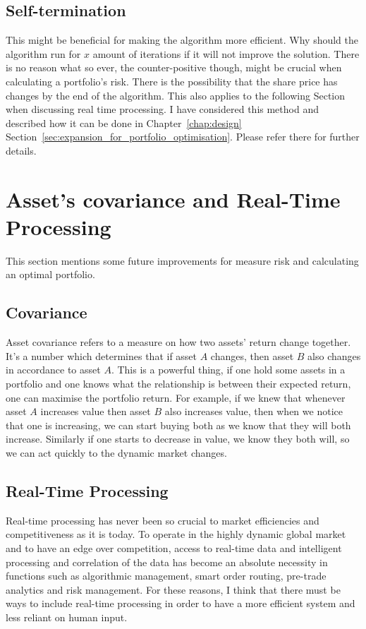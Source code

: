 \documentclass{pdfmx4020}
\begin{document}
    \subsection{Self-termination} %
    \label{sub:self_termination}
      This might be beneficial for making the algorithm more efficient. Why should the algorithm run for $x$ amount of iterations if it will not improve the solution. There is no reason what so ever, the counter-positive though, might be crucial when calculating a portfolio's risk. There is the possibility that the share price has changes by the end of the algorithm. This also applies to the following Section~ when discussing real time processing. I have considered this method and described how it can be done in Chapter~\ref{chap:design} Section~\ref{sec:expansion_for_portfolio_optimisation}. Please refer there for further details.

  \section{Asset's covariance and Real-Time Processing} %
  \label{sec:asset_s_covariance_and_real_time_processing}
  This section mentions some future improvements for measure risk and calculating an optimal portfolio.
    \subsection{Covariance} %
    \label{sub:covariance}
      Asset covariance refers to a measure on how two assets' return change together. It's a number which determines that if asset $A$ changes, then asset $B$ also changes in accordance to asset $A$. This is a powerful thing, if one hold some assets in a portfolio and one knows what the relationship is between their expected return, one can maximise the portfolio return. For example, if we knew that whenever asset $A$ increases value then asset $B$ also increases value, then when we notice that one is increasing, we can start buying both as we know that they will both increase. Similarly if one starts to decrease in value, we know they both will, so we can act quickly to the dynamic market changes. 
    \subsection{Real-Time Processing} %
    \label{sub:real_time_processing}
      Real-time processing has never been so crucial to market efficiencies and competitiveness as it is today. To operate in the highly dynamic global market and to have an edge over competition, access to real-time data and intelligent processing and correlation of the data has become an absolute necessity in functions such as algorithmic management, smart order routing, pre-trade analytics and risk management. For these reasons, I think that there must be ways to include real-time processing in order to have a more efficient system and less reliant on human input. 
\end{document}
